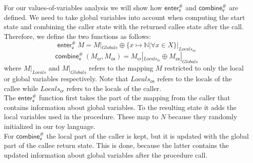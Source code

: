     For our values-of-variables analysis we will show how $\textsf{enter}^{\#}_\textsf{v}$ and $\textsf{combine}^{\#}_\textsf{v}$ are defined. We need to take global variables into account when computing the start state and combining the caller state with the returned callee state after the call. Therefore, we define the two functions as follows:
    \[\textsf{enter}^{\#}_\textsf{v}\ M = M|_{Globals} \oplus \{x \mapsto \mathbb{N} | \forall x \in X\}|_{Locals_\textsf{ce}} \]
    \[\textsf{combine}^{\#}_\textsf{v}\ (M_\textsf{cr}, M_\textsf{ce}) = M_\textsf{cr}|_{Locals_\textsf{cr}} \oplus M_\textsf{ce}|_{Globals} \]
    where $M|_{Locals}$ and $M|_{Globals}$ refers to the mapping $M$ restricted to only the local or global variables respectively. Note that $Locals_\textsf{ce}$ refers to the locals of the callee while $Locals_\textsf{cr}$ refers to the locals of the caller.\\
    The $\textsf{enter}^{\#}_\textsf{v}$ function first takes the part of the mapping from the caller that contains information about global variables. To the resulting state it adds the local variables used in the procedure. These map to $N$ because they randomly initialized in our toy language.\\
    For $\textsf{combine}^{\#}_\textsf{v}$ the local part of the caller is kept, but it is updated with the global part of the callee return state. This is done, because the latter contains the updated information about global variables after the procedure call.\\

